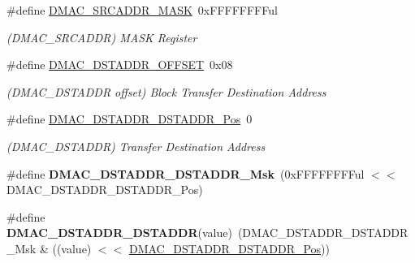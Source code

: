 \begin{DoxyCompactItemize}
\item 
\hypertarget{group___s_a_m_l21___d_m_a_c_ga9ac8c4e53c5e259f55f800f4825d969c}{}\#define \hyperlink{group___s_a_m_l21___d_m_a_c_ga9ac8c4e53c5e259f55f800f4825d969c}{D\+M\+A\+C\+\_\+\+S\+R\+C\+A\+D\+D\+R\+\_\+\+M\+A\+S\+K}~0x\+F\+F\+F\+F\+F\+F\+F\+Ful\label{group___s_a_m_l21___d_m_a_c_ga9ac8c4e53c5e259f55f800f4825d969c}

\begin{DoxyCompactList}\small\item\em (D\+M\+A\+C\+\_\+\+S\+R\+C\+A\+D\+D\+R) M\+A\+S\+K Register \end{DoxyCompactList}\item 
\hypertarget{group___s_a_m_l21___d_m_a_c_ga2a50508d7f408649cc4548f287d03997}{}\#define \hyperlink{group___s_a_m_l21___d_m_a_c_ga2a50508d7f408649cc4548f287d03997}{D\+M\+A\+C\+\_\+\+D\+S\+T\+A\+D\+D\+R\+\_\+\+O\+F\+F\+S\+E\+T}~0x08\label{group___s_a_m_l21___d_m_a_c_ga2a50508d7f408649cc4548f287d03997}

\begin{DoxyCompactList}\small\item\em (D\+M\+A\+C\+\_\+\+D\+S\+T\+A\+D\+D\+R offset) Block Transfer Destination Address \end{DoxyCompactList}\item 
\hypertarget{group___s_a_m_l21___d_m_a_c_ga987e326ffd8f63aea885b7f6ed74cb17}{}\#define \hyperlink{group___s_a_m_l21___d_m_a_c_ga987e326ffd8f63aea885b7f6ed74cb17}{D\+M\+A\+C\+\_\+\+D\+S\+T\+A\+D\+D\+R\+\_\+\+D\+S\+T\+A\+D\+D\+R\+\_\+\+Pos}~0\label{group___s_a_m_l21___d_m_a_c_ga987e326ffd8f63aea885b7f6ed74cb17}

\begin{DoxyCompactList}\small\item\em (D\+M\+A\+C\+\_\+\+D\+S\+T\+A\+D\+D\+R) Transfer Destination Address \end{DoxyCompactList}\item 
\hypertarget{group___s_a_m_l21___d_m_a_c_gacc265201fa00cb96810a0c817039bc15}{}\#define {\bfseries D\+M\+A\+C\+\_\+\+D\+S\+T\+A\+D\+D\+R\+\_\+\+D\+S\+T\+A\+D\+D\+R\+\_\+\+Msk}~(0x\+F\+F\+F\+F\+F\+F\+F\+Ful $<$$<$ D\+M\+A\+C\+\_\+\+D\+S\+T\+A\+D\+D\+R\+\_\+\+D\+S\+T\+A\+D\+D\+R\+\_\+\+Pos)\label{group___s_a_m_l21___d_m_a_c_gacc265201fa00cb96810a0c817039bc15}

\item 
\hypertarget{group___s_a_m_l21___d_m_a_c_ga48e696dcafbf63ae50fabb9a8417e805}{}\#define {\bfseries D\+M\+A\+C\+\_\+\+D\+S\+T\+A\+D\+D\+R\+\_\+\+D\+S\+T\+A\+D\+D\+R}(value)~(D\+M\+A\+C\+\_\+\+D\+S\+T\+A\+D\+D\+R\+\_\+\+D\+S\+T\+A\+D\+D\+R\+\_\+\+Msk \& ((value) $<$$<$ \hyperlink{group___s_a_m_l21___d_m_a_c_ga987e326ffd8f63aea885b7f6ed74cb17}{D\+M\+A\+C\+\_\+\+D\+S\+T\+A\+D\+D\+R\+\_\+\+D\+S\+T\+A\+D\+D\+R\+\_\+\+Pos}))\label{group___s_a_m_l21___d_m_a_c_ga48e696dcafbf63ae50fabb9a8417e805}


\end{DoxyCompactItemize}
